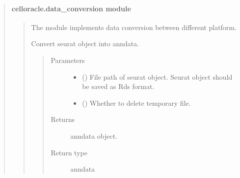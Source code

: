 \documentclass[letterpaper,10pt,english]{sphinxmanual}
\begin{document}
\begin{quote}
\begin{quote}
\end{quote}


\paragraph{celloracle.data\_conversion module}
\label{\detokenize{modules/celloracle.data_conversion:celloracle-data-conversion-module}}\label{\detokenize{modules/celloracle.data_conversion::doc}}\begin{quote}
\label{\detokenize{modules/celloracle.data_conversion:module-celloracle.data_conversion}}
The {\hyperref[\detokenize{modules/celloracle.data_conversion:module-celloracle.data_conversion}]{}} module implements data conversion between different platform.

\begin{fulllineitems}
\label{\detokenize{modules/celloracle.data_conversion:celloracle.data_conversion.seurat_object_to_anndata}}
Convert seurat object into anndata.
\begin{quote}\begin{description}
\item[{Parameters}] \leavevmode\begin{itemize}
\item {} 
 () \textendash{} File path of seurat object. Seurat object should be saved as Rds format.

\item {} 
 () \textendash{} Whether to delete temporary file.

\end{itemize}

\item[{Returns}] \leavevmode
anndata object.

\item[{Return type}] \leavevmode
anndata

\end{description}\end{quote}

\end{fulllineitems}

\end{quote}
\end{quote}
\end{document}
